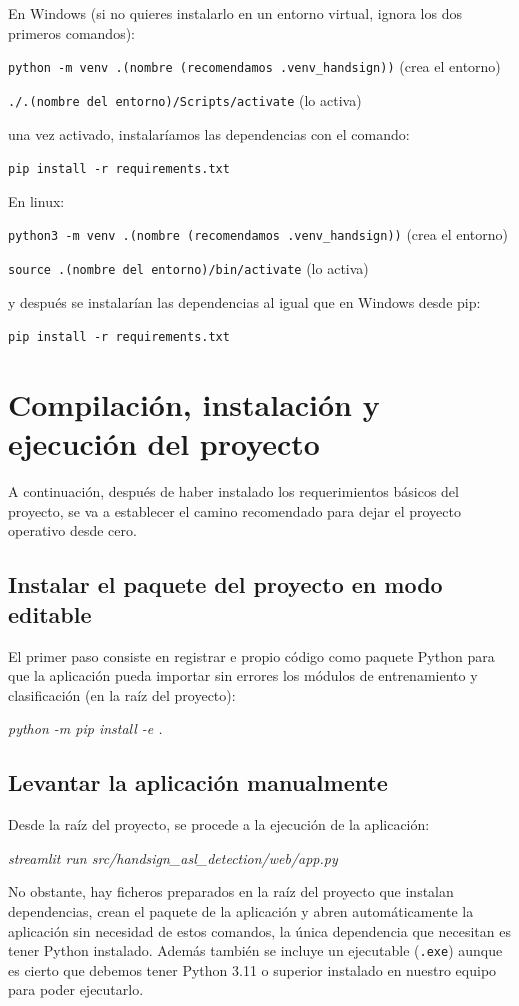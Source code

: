 En Windows (si no quieres instalarlo en un entorno virtual, ignora los dos primeros comandos): 


\texttt{python -m venv .(nombre (recomendamos .venv\_handsign))} (crea el entorno)

\texttt{./.(nombre del entorno)/Scripts/activate} (lo activa)

una vez activado, instalaríamos las dependencias con el comando:

\texttt{pip install -r requirements.txt}

En linux:

\texttt{python3 -m venv .(nombre (recomendamos .venv\_handsign))} (crea el entorno)

\texttt{source .(nombre del entorno)/bin/activate} (lo activa)

y después se instalarían las dependencias al igual que en Windows desde pip:

\texttt{pip install -r requirements.txt}



\section{Compilación, instalación y ejecución del proyecto}
A continuación, después de haber instalado los requerimientos básicos del proyecto, se va a establecer el camino recomendado para dejar el proyecto operativo desde cero. 

\subsection{Instalar el paquete del proyecto en modo editable}


El primer paso consiste en registrar e propio código como paquete Python para que la aplicación pueda importar sin errores los módulos de entrenamiento y clasificación (en la raíz del proyecto):

\textit{python -m pip install -e .}

\subsection{Levantar la aplicación manualmente}
Desde la raíz del proyecto, se procede a la ejecución de la aplicación:

\textit{streamlit run src/handsign\_asl\_detection/web/app.py}

No obstante, hay ficheros preparados en la raíz del proyecto que instalan dependencias, crean el paquete de la aplicación y abren automáticamente la aplicación sin necesidad de estos comandos, la única dependencia que necesitan es tener Python instalado.
Además también se incluye un ejecutable (\texttt{.exe}) aunque es cierto que debemos tener Python 3.11 o superior instalado en nuestro equipo para poder ejecutarlo.

